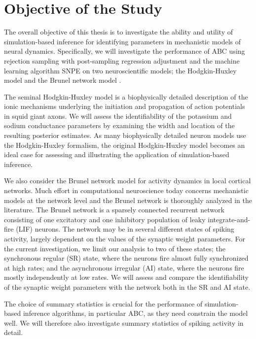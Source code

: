 \section{Objective of the Study}

The overall objective of this thesis is to investigate the ability and utility of simulation-based inference for identifying parameters in mechanistic models of neural dynamics. Specifically, we will investigate the performance of ABC using rejection sampling with post-sampling regression adjustment and the machine learning algorithm SNPE on two neuroscientific models; the Hodgkin-Huxley model \cite{HH1952} and the Brunel network model \cite{Brunel2000}. 

The seminal Hodgkin-Huxley model is a biophysically detailed description of the ionic mechanisms underlying the initiation and propagation of action potentials in squid giant axons. We will assess the identifiability of the potassium and sodium conductance parameters by examining the width and location of the resulting posterior estimates. As many biophysically detailed neuron models use the Hodgkin-Huxley formalism, the original Hodgkin-Huxley model becomes an ideal case for assessing and illustrating the application of simulation-based inference. 

We also consider the Brunel network model for activity dynamics in local cortical networks. Much effort in computational neuroscience today concerns mechanistic models at the network level and the Brunel network is thoroughly analyzed in the literature. The Brunel network is a sparsely connected recurrent network consisting of one excitatory and one inhibitory population of leaky integrate-and-fire (LIF) neurons. The network may be in several different states of spiking activity, largely dependent on the values of the synaptic weight parameters. For the current investigation, we limit our analysis to two of these states; the synchronous regular (SR) state, where the neurons fire almost fully synchronized at high rates; and the asynchronous irregular (AI) state, where the neurons fire mostly independently at low rates. We will assess and compare the identifiability of the synaptic weight parameters with the network both in the SR and AI state. 

The choice of summary statistics is crucial for the performance of simulation-based inference algorithms, in particular ABC, as they need constrain the model well. We will therefore also investigate summary statistics of spiking activity in detail. 

